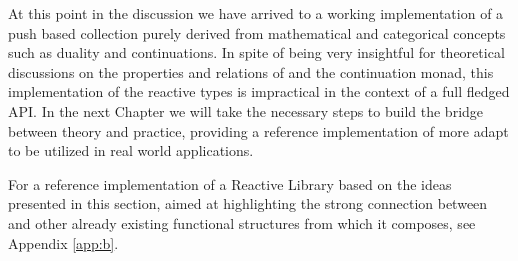 At this point in the discussion we have arrived to a working implementation of a push based collection purely derived from mathematical and categorical concepts such as duality and continuations. In spite of being very insightful for theoretical discussions on the properties and relations of  and the continuation monad, this implementation of the reactive types is impractical in the context of a full fledged API. In the next Chapter we will take the necessary steps to build the bridge between theory and practice, providing a reference implementation of  more adapt to be utilized in real world applications.

For a reference implementation of a Reactive Library based on the ideas presented in this section, aimed at highlighting the strong connection between  and other already existing functional structures from which it composes, see Appendix \ref{app:b}. 